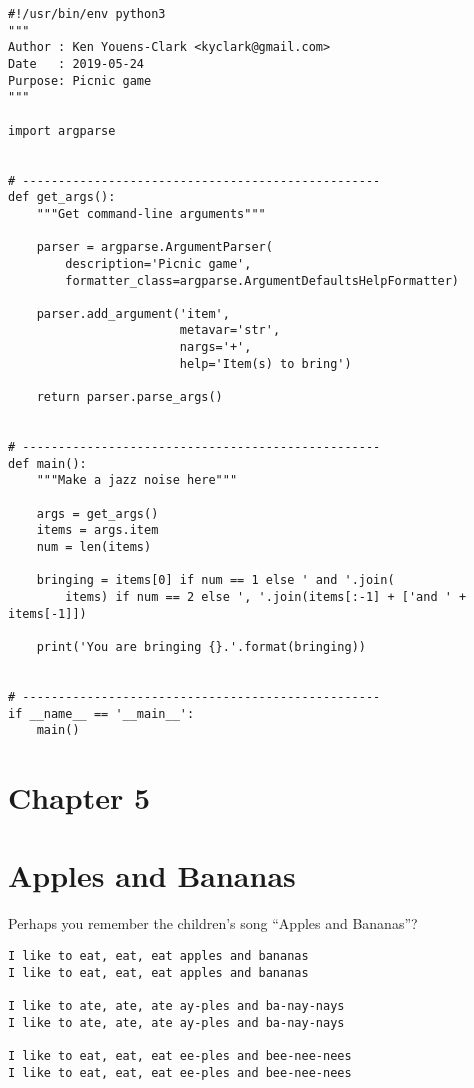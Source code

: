 \documentclass[]{article}
\begin{document}
\begin{verbatim}
#!/usr/bin/env python3
"""
Author : Ken Youens-Clark <kyclark@gmail.com>
Date   : 2019-05-24
Purpose: Picnic game
"""

import argparse


# --------------------------------------------------
def get_args():
    """Get command-line arguments"""

    parser = argparse.ArgumentParser(
        description='Picnic game',
        formatter_class=argparse.ArgumentDefaultsHelpFormatter)

    parser.add_argument('item',
                        metavar='str',
                        nargs='+',
                        help='Item(s) to bring')

    return parser.parse_args()


# --------------------------------------------------
def main():
    """Make a jazz noise here"""

    args = get_args()
    items = args.item
    num = len(items)

    bringing = items[0] if num == 1 else ' and '.join(
        items) if num == 2 else ', '.join(items[:-1] + ['and ' + items[-1]])

    print('You are bringing {}.'.format(bringing))


# --------------------------------------------------
if __name__ == '__main__':
    main()
\end{verbatim}

\pagebreak

\hypertarget{chapter-5}{%
\section{Chapter 5}\label{chapter-5}}

\hypertarget{apples-and-bananas}{%
\section{Apples and Bananas}\label{apples-and-bananas}}

Perhaps you remember the children's song ``Apples and Bananas''?

\begin{verbatim}
I like to eat, eat, eat apples and bananas
I like to eat, eat, eat apples and bananas

I like to ate, ate, ate ay-ples and ba-nay-nays
I like to ate, ate, ate ay-ples and ba-nay-nays

I like to eat, eat, eat ee-ples and bee-nee-nees
I like to eat, eat, eat ee-ples and bee-nee-nees
\end{verbatim}
\end{document}
